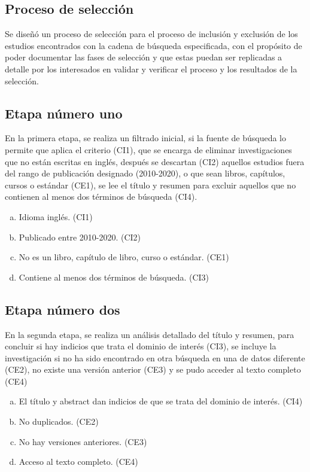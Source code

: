 \documentclass[conference,onecolumn,10pt]{IEEEtran}
\begin{document}
\subsection{Proceso de selección} \label{ssec:pro-selec}

Se diseñó un proceso de selección para el proceso de inclusión y exclusión de los estudios 
encontrados con la cadena de búsqueda especificada, con el propósito de poder documentar 
las fases de selección y que estas puedan ser replicadas a detalle por los 
interesados en validar y verificar el proceso y los resultados de la selección.

\subsection{Etapa número uno}
En la primera etapa, se realiza un filtrado inicial, si la fuente de búsqueda 
lo permite que aplica el criterio (CI1), que se encarga de eliminar 
investigaciones que no están escritas en inglés, después 
se descartan (CI2) aquellos estudios fuera del rango de publicación designado (2010-2020), 
o que sean libros, capítulos, cursos o estándar (CE1), se lee el título y resumen para 
excluir aquellos que no contienen al menos dos términos de búsqueda (CI4).

\begin{enumerate}[(a)]
  \item{Idioma inglés. (CI1)}
  \item{Publicado entre 2010-2020. (CI2)}
  \item{No es un libro, capítulo de libro, curso o estándar. (CE1)}
  \item{Contiene al menos dos términos de búsqueda. (CI3)}
\end{enumerate}

\subsection{Etapa número dos}
En la segunda etapa, se realiza un análisis detallado del título y resumen, para 
concluir si hay indicios que trata el dominio de interés (CI3), se incluye 
la investigación si no ha sido encontrado en otra búsqueda en una de datos diferente (CE2), 
no existe una versión anterior (CE3) y se pudo acceder al texto completo (CE4)

\begin{enumerate}[(a)]
  \item{El título y abstract dan indicios de que se trata del dominio de interés. (CI4)}
  \item{No duplicados. (CE2)}
  \item{No hay versiones anteriores. (CE3) }
  \item{Acceso al texto completo. (CE4)}
\end{enumerate}
\end{document}

